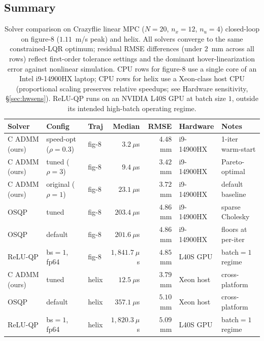 \documentclass[conference]{IEEEtran}
\begin{document}
\subsection{Summary}

\begin{table}[t]
\centering
\caption{Solver comparison on Crazyflie linear MPC ($N=20$, $n_x=12$, $n_u=4$) closed-loop on figure-8 ($1.11$~m/s peak) and helix. All solvers converge to the same constrained-LQR optimum; residual RMSE differences (under $2$~mm across all rows) reflect first-order tolerance settings and the dominant hover-linearization error against nonlinear simulation. CPU rows for figure-8 use a single core of an Intel i9-14900HX laptop; CPU rows for helix use a Xeon-class host CPU (proportional scaling preserves relative speedups; see Hardware sensitivity, \S\ref{sec:hwsens}). ReLU-QP runs on an NVIDIA L40S GPU at batch size $1$, outside its intended high-batch operating regime.}
\label{tab:solvers}
\scriptsize
\setlength{\tabcolsep}{4pt}
\begin{tabular}{lllrrll}
\toprule
\textbf{Solver} & \textbf{Config} & \textbf{Traj} & \textbf{Median} & \textbf{RMSE} & \textbf{Hardware} & \textbf{Notes} \\
\midrule
C ADMM (ours) & speed-opt ($\rho{=}0.3$) & fig-8 & $3.2~\mu$s & $4.48$~mm & i9-14900HX & 1-iter warm-start \\
C ADMM (ours) & tuned ($\rho{=}3$)       & fig-8 & $9.4~\mu$s & $3.42$~mm & i9-14900HX & Pareto-optimal \\
C ADMM (ours) & original ($\rho{=}1$)    & fig-8 & $23.1~\mu$s & $3.72$~mm & i9-14900HX & default baseline \\
OSQP          & tuned                     & fig-8 & $203.4~\mu$s & $4.86$~mm & i9-14900HX & sparse Cholesky \\
OSQP          & default                   & fig-8 & $201.6~\mu$s & $4.86$~mm & i9-14900HX & floors at per-iter \\
ReLU-QP       & bs$=1$, fp64              & fig-8 & $1{,}841.7~\mu$s & $4.85$~mm & L40S GPU   & batch$=1$ regime \\
\midrule
C ADMM (ours) & tuned                     & helix & $12.5~\mu$s     & $3.79$~mm & Xeon host  & cross-platform \\
OSQP          & default                   & helix & $357.1~\mu$s    & $5.10$~mm & Xeon host  & cross-platform \\
ReLU-QP       & bs$=1$, fp64              & helix & $1{,}820.3~\mu$s & $5.09$~mm & L40S GPU   & batch$=1$ regime \\
\bottomrule
\end{tabular}
\end{table}
\end{document}
